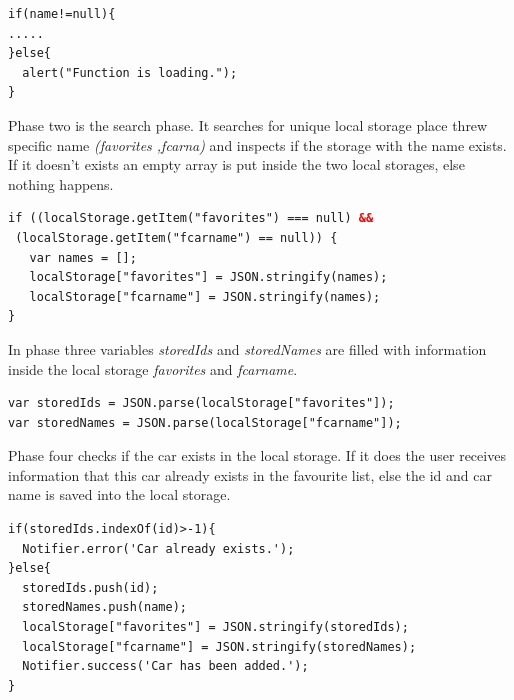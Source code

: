 \begin{lstlisting}[language=html, caption= 
Phase one,captionpos=b]
if(name!=null){
.....
}else{
  alert("Function is loading.");
}
\end{lstlisting}

Phase two is the search phase. It searches for unique local storage place threw specific name \textit{(favorites ,fcarna)} and inspects if the storage with the name exists. If it doesn't exists an empty array is put inside the two local storages, else nothing happens.
\\

\begin{lstlisting}[language=html, caption= 
Phase two,captionpos=b]
if ((localStorage.getItem("favorites") === null) &&
 (localStorage.getItem("fcarname") == null)) {
   var names = [];
   localStorage["favorites"] = JSON.stringify(names);	
   localStorage["fcarname"] = JSON.stringify(names);
}
\end{lstlisting}


In phase three variables \textit{storedIds} and \textit{storedNames} are filled with information inside the local storage \textit{favorites} and \textit{fcarname}.
\\

\begin{lstlisting}[language=html, caption= 
Phase three,captionpos=b]
var storedIds = JSON.parse(localStorage["favorites"]);
var storedNames = JSON.parse(localStorage["fcarname"]);
\end{lstlisting}


Phase four checks if the car exists in the local storage. If it does the user receives information that this car already exists in the favourite list, else the id and car name is saved into the local storage.
\\
\newpage


\begin{lstlisting}[language=html, caption= 
Phase four,captionpos=b]
if(storedIds.indexOf(id)>-1){
  Notifier.error('Car already exists.');
}else{
  storedIds.push(id);
  storedNames.push(name);
  localStorage["favorites"] = JSON.stringify(storedIds);
  localStorage["fcarname"] = JSON.stringify(storedNames);
  Notifier.success('Car has been added.');
}
\end{lstlisting}


